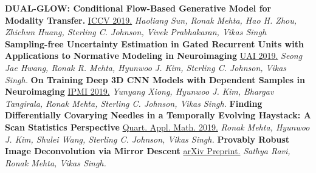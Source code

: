 \documentclass[]{article}
\begin{document}
{\bf  DUAL-GLOW: Conditional Flow-Based Generative Model for Modality Transfer.}
\newline
\href{http://openaccess.thecvf.com/content_ICCV_2019/html/Sun_DUAL-GLOW_Conditional_Flow-Based_Generative_Model_for_Modality_Transfer_ICCV_2019_paper.html}{ICCV 2019.}
\textit{Haoliang Sun, Ronak Mehta, Hao H. Zhou, Zhichun Huang, Sterling C. Johnson, Vivek Prabhakaran, Vikas Singh}
\newline\newline
{\bf Sampling-free Uncertainty Estimation in Gated Recurrent Units with Applications to Normative Modeling in Neuroimaging }
\newline
\href{http://auai.org/uai2019/proceedings/papers/296.pdf}{UAI 2019.}
\textit{Seong Jae Hwang, Ronak R. Mehta, Hyunwoo J. Kim, Sterling C. Johnson, Vikas Singh.}
\newline\newline
{\bf On Training Deep 3D CNN Models with Dependent Samples in Neuroimaging}
\newline
\href{https://link.springer.com/chapter/10.1007/978-3-030-20351-1_8}{IPMI 2019.}
\textit{Yunyang Xiong, Hyunwoo J. Kim, Bhargav Tangirala, Ronak Mehta, Sterling C. Johnson, Vikas Singh.}
\newline\newline
{\bf   Finding Differentially Covarying Needles in a Temporally Evolving Haystack: A Scan Statistics Perspective }
\newline
\href{https://www.ams.org/journals/qam/2019-77-02/S0033-569X-2018-01522-9/}{Quart. Appl. Math. 2019.}
\textit{Ronak Mehta, Hyunwoo J. Kim, Shulei Wang, Sterling C. Johnson, Vikas Singh.}
\newline\newline
{\bf Provably Robust Image Deconvolution via Mirror Descent}
\newline
\href{https://arxiv.org/abs/1803.08137}{arXiv Preprint.}
\textit{Sathya Ravi, Ronak Mehta, Vikas Singh.}
\end{document}
